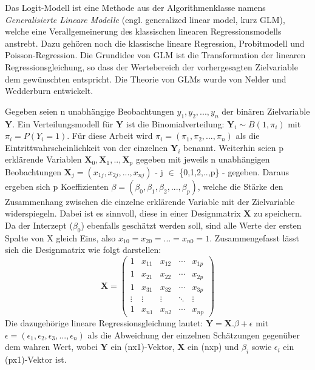 \documentclass[12pt,]{article}
\begin{document}
Das Logit-Modell ist eine Methode aus der Algorithmenklasse namens
\emph{Generalisierte Lineare Modelle} (engl. generalized linear model,
kurz GLM), welche eine Verallgemeinerung des klassischen linearen
Regressionsmodells anstrebt. Dazu gehören noch die klassische lineare
Regression, Probitmodell und Poisson-Regression. Die Grundidee von GLM
ist die Transformation der linearen Regressionsgleichung, so dass der
Wertebereich der vorhergesagten Zielvariable dem gewünschten entspricht.
Die Theorie von GLMs wurde von Nelder und Wedderburn entwickelt.

Gegeben seien n unabhängige Beobachtungen \(y_1, y_2, ...,y_n\) der
binären Zielvariable \(\mathbf{Y}\). Ein Verteilungsmodell für
\(\mathbf{Y}\) ist die Binomialverteilung:
\(\mathbf{Y}_i \sim B(1, \pi_i)\) mit \(\pi_i = P(Y_i = 1)\). Für diese
Arbeit wird \(\pi_i = (\pi_1, \pi_2, ..., \pi_n)\) als die
Eintrittwahrscheinlichkeit von der einzelnen \(\mathbf{Y}_i\) benannt.
Weiterhin seien p erklärende Variablen
\(\mathbf{X}_0,\mathbf{X}_1,..,\mathbf{X}_p\) gegeben mit jeweils n
unabhängigen Beobachtungen
\(\mathbf{X}_j = (x_{1j}, x_{2j},..., x_{nj})\) - j \(\in\)
\{0,1,2,..,p\} - gegeben. Daraus ergeben sich p Koeffizienten
\(\beta = (\beta_0, \beta_1, \beta_2,..., \beta_p)\), welche die Stärke
den Zusammenhang zwischen die einzelne erklärende Variable mit der
Zielvariable widerspiegeln. Dabei ist es sinnvoll, diese in einer
Designmatrix \(\mathbf{X}\) zu speichern. Da der Interzept (\(\beta_0\))
ebenfalls geschätzt werden soll, sind alle Werte der ersten Spalte von X
gleich Eins, also \(x_{10} = x_{20} = ... = x_{n0} = 1\).
Zusammengefasst lässt sich die Designmatrix wie folgt darstellen: \[
\mathbf{X} =
 \begin{pmatrix}
    1 & x_{11} & x_{12} & \cdots & x_{1p} \\
    1 & x_{21} & x_{22} & \cdots & x_{2p} \\
    1 & x_{31} & x_{32} & \cdots & x_{3p} \\
    \vdots  & \vdots  & \vdots & \ddots & \vdots \\
    1 & x_{n1} & x_{n2} & \cdots & x_{np}
 \end{pmatrix}
\] Die dazugehörige lineare Regressionsgleichung lautet:
\(\mathbf{Y} = \mathbf{X}.\beta + \epsilon\) mit
\(\epsilon = (\epsilon_1, \epsilon_2, \epsilon_3, ..., \epsilon_n)\) als
die Abweichung der einzelnen Schätzungen gegenüber dem wahren Wert,
wobei \(\mathbf{Y}\) ein (nx1)-Vektor, \(\mathbf{X}\) ein (nxp) und
\(\beta_i\) sowie \(\epsilon_i\) ein (px1)-Vektor ist.
\end{document}
